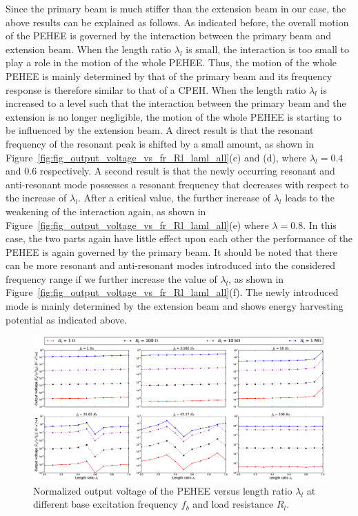 \documentclass{elsarticle}
\begin{document}
Since the primary beam is much stiffer than the extension beam in our case, the above results can be explained as follows. As indicated before, the overall motion of the PEHEE is governed by the interaction between the primary beam and extension beam. When the length ratio $\lambda_l$ is small, the interaction is too small to play a role in the motion of the whole PEHEE. Thus, the motion of the whole PEHEE is mainly determined by that of the primary beam and its frequency response is therefore similar to that of a CPEH. When the length ratio $\lambda_l$ is increased to a level such that the interaction between the primary beam and the extension is no longer negligible, the motion of the whole PEHEE is starting to be influenced by the extension beam. A direct result is that the resonant frequency of the resonant peak is shifted by a small amount, as shown in Figure~\ref{fig:fig_output_voltage_vs_fr_Rl_laml_all}(c) and (d), where $\lambda_l = 0.4$ and $0.6$ respectively. A second result is that the newly occurring resonant and anti-resonant mode possesses a resonant frequency that decreases with respect to the increase of $\lambda_l$. After a critical value, the further increase of $\lambda_l$ leads to the weakening of the interaction again, as shown in Figure~\ref{fig:fig_output_voltage_vs_fr_Rl_laml_all}(e) where $\lambda = 0.8$. In this case, the two parts again have little effect upon each other the performance of the PEHEE is again governed by the primary beam. It should be noted that there can be more resonant and anti-resonant modes introduced into the considered frequency range if we further increase the value of $\lambda_l$, as shown in Figure~\ref{fig:fig_output_voltage_vs_fr_Rl_laml_all}(f). The newly introduced mode is mainly determined by the extension beam and shows energy harvesting potential as indicated above. 

\begin{figure}[!htbp]
    \centering
    \includegraphics[width=\textwidth]{./fig_vol_fr_sl_Rl_sl_vs_laml}
    \caption{ Normalized output voltage of the PEHEE versus length ratio $\lambda_l$ at different base excitation frequency $f_b$ and load resistance $R_l$. }
    \label{fig:fig_vol_fr_sl_Rl_sl_vs_laml}
\end{figure}
\end{document}
